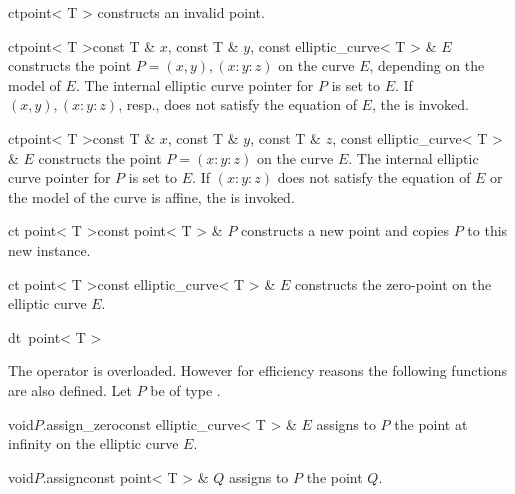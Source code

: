 \CONS


\begin{fcode}{ct}{point< T >}{}
  constructs an invalid point.
\end{fcode}

\begin{fcode}{ct}{point< T >}{const T & $x$, const T & $y$, 
const elliptic_curve< T > & $E$} constructs the point $P = (x, y), (x
  : y : z)$ on the curve $E$, depending on the model of $E$. The
  internal elliptic curve pointer for $P$ is set to $E$. If $(x, y),
  (x : y : z)$, resp., does not satisfy the equation of $E$, the \LEH
  is invoked.
\end{fcode}

\begin{fcode}{ct}{point< T >}{const T & $x$, const T & $y$, 
const T & $z$, const elliptic_curve< T > & $E$} constructs the point
  $P = (x: y: z)$ on the curve $E$.  The internal elliptic curve
  pointer for $P$ is set to $E$. If $(x: y: z)$ does not satisfy the
  equation of $E$ or the model of the curve is affine, the \LEH is
  invoked.
\end{fcode}

\begin{fcode}{ct }{point< T >}{const point< T > & $P$}
  constructs a new point and copies $P$ to this new instance.
\end{fcode}

\begin{fcode}{ct }{point< T >}{const elliptic_curve< T > & $E$}
  constructs the zero-point on the elliptic curve $E$.
\end{fcode}

\begin{fcode}{dt}{~point< T >}{}
\end{fcode}



\ASGN

The operator \code{=} is overloaded.  However for efficiency reasons
the following functions are also defined.  Let $P$ be of type
.

\begin{fcode}{void}{$P$.assign_zero}{const elliptic_curve< T > & $E$}
  assigns to $P$ the point at infinity on the elliptic curve $E$.
\end{fcode}

\begin{fcode}{void}{$P$.assign}{const point< T > & $Q$}
  assigns to $P$ the point $Q$.
\end{fcode}


